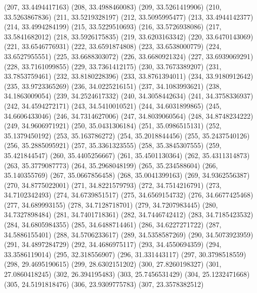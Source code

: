 {					(207, 33.4494417163)
					(208, 33.4988460083)
					(209, 33.5261419906)
					(210, 33.5263867836)
					(211, 33.5219328197)
					(212, 33.5095995477)
					(213, 33.4944142377)
					(214, 33.4994284199)
					(215, 33.5229510693)
					(216, 33.5726938086)
					(217, 33.5841682012)
					(218, 33.5926175835)
					(219, 33.6203163342)
					(220, 33.6470143069)
					(221, 33.6546776931)
					(222, 33.6591874808)
					(223, 33.6538000779)
					(224, 33.6527955551)
					(225, 33.6688303072)
					(226, 33.6680921324)
					(227, 33.6939069291)
					(228, 33.7161099855)
					(229, 33.7361412175)
					(230, 33.7673389207)
					(231, 33.7853759461)
					(232, 33.8180228396)
					(233, 33.8761394011)
					(234, 33.9180912642)
					(235, 33.9723365269)
					(236, 34.0225216151)
					(237, 34.1083993621)
					(238, 34.1863009054)
					(239, 34.2524617332)
					(240, 34.3058442634)
					(241, 34.3758336937)
					(242, 34.4594272171)
					(243, 34.5410010521)
					(244, 34.6031899865)
					(245, 34.6606433046)
					(246, 34.7314627006)
					(247, 34.8039060564)
					(248, 34.8748234222)
					(249, 34.9606971921)
					(250, 35.0431306184)
					(251, 35.0986515131)
					(252, 35.1379450192)
					(253, 35.163786272)
					(254, 35.2018844456)
					(255, 35.2437540126)
					(256, 35.2885095921)
					(257, 35.3361323555)
					(258, 35.3845307555)
					(259, 35.421844547)
					(260, 35.4405256667)
					(261, 35.4501130364)
					(262, 35.4311314873)
					(263, 35.3779087773)
					(264, 35.2968048199)
					(265, 35.234588604)
					(266, 35.140355769)
					(267, 35.0667856458)
					(268, 35.0041399163)
					(269, 34.9362556387)
					(270, 34.8775022001)
					(271, 34.8221579793)
					(272, 34.7514216791)
					(273, 34.7102342493)
					(274, 34.6739851517)
					(275, 34.6569154732)
					(276, 34.6677425468)
					(277, 34.689993155)
					(278, 34.7128718701)
					(279, 34.7207983445)
					(280, 34.7327898484)
					(281, 34.7401718361)
					(282, 34.7446742412)
					(283, 34.7185423532)
					(284, 34.6805984355)
					(285, 34.6488714461)
					(286, 34.6227271722)
					(287, 34.5886155401)
					(288, 34.5706233617)
					(289, 34.5358587269)
					(290, 34.5073923959)
					(291, 34.4897284729)
					(292, 34.4686975117)
					(293, 34.4550694359)
					(294, 33.3586119014)
					(295, 32.318556907)
					(296, 31.331443117)
					(297, 30.3798518559)
					(298, 29.4695190615)
					(299, 28.6302151202)
					(300, 27.8260198327)
					(301, 27.0860418245)
					(302, 26.394195483)
					(303, 25.7456531429)
					(304, 25.1232471668)
					(305, 24.5191818476)
					(306, 23.9309775783)
					(307, 23.3578382512)
}
